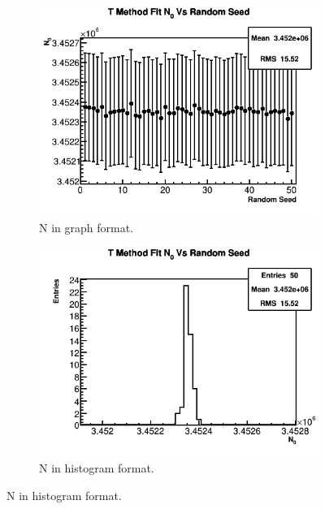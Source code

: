	\begin{figure}[]
	\centering
	    \begin{subfigure}[t]{0.45\textwidth}
		    \centering
			\includegraphics[width=\textwidth]{TMethod_N_0_Vs_Iter_Canv}
		    \caption{N in graph format.}
	    \end{subfigure}
	    \hspace{4mm}
	    \begin{subfigure}[t]{0.45\textwidth}
		    \centering
			\includegraphics[width=\textwidth]{TMethod_N_0_Vs_Iter_Canv_hist}
		    \caption{N in histogram format.}
	    \end{subfigure}%
	   	\vspace{4mm}

\end{figure}

